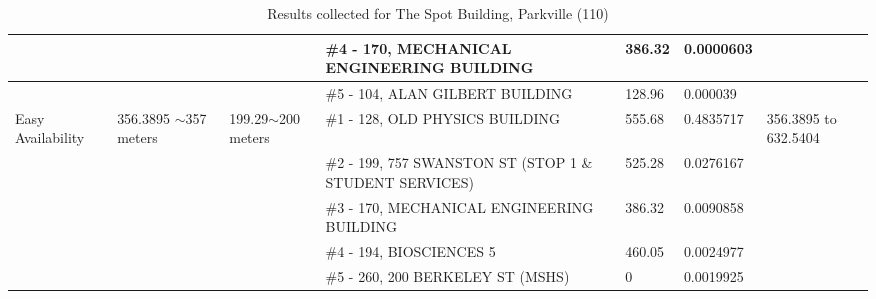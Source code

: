 \begin{table}[H]
{\begin{tabular}{|l|l|l|l|l|l|l|}
                        &                           &                                                 & \#4 - 170, MECHANICAL ENGINEERING BUILDING              & 386.32        & 0.0000603       &                           \\ \hline
                        &                           &                                                 & \#5 - 104, ALAN GILBERT BUILDING                        & 128.96        & 0.000039        &                           \\ \hline
Easy Availability       & 356.3895 $\sim$357 meters & 199.29$\sim$200 meters                          & \#1 - 128, OLD PHYSICS BUILDING                         & 555.68        & 0.4835717       & 356.3895 to 632.5404      \\ \hline
                        &                           &                                                 & \#2 - 199, 757 SWANSTON ST (STOP 1 \& STUDENT SERVICES) & 525.28        & 0.0276167       &                           \\ \hline
                        &                           &                                                 & \#3 - 170, MECHANICAL ENGINEERING BUILDING              & 386.32        & 0.0090858       &                           \\ \hline
                        &                           &                                                 & \#4 - 194, BIOSCIENCES 5                                & 460.05        & 0.0024977       &                           \\ \hline
                        &                           &                                                 & \#5 - 260, 200 BERKELEY ST (MSHS)                       & 0             & 0.0019925       &                           \\ \hline
\end{tabular}

}
\caption{Results collected for The Spot Building, Parkville (110)}
\label{appendix:spot}
\end{table}



